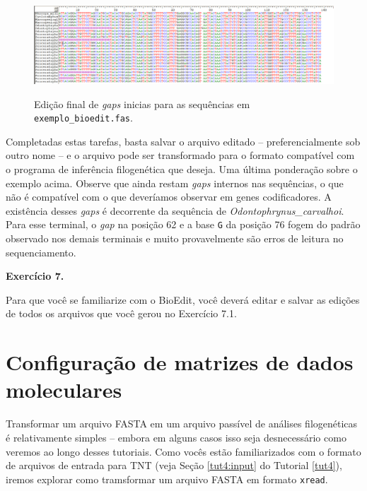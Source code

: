 \begin{refsection}
  \begin{figure}[H]
       \centering
      {\includegraphics[scale=0.3]{figures/tut7/bioedit_edited.eps}}
	{\caption[Bioedit: Edição final de \textit{gaps} inicias]{Edição final de \textit{gaps} inicias para as sequências em \texttt{exemplo\_bioedit.fas}.}\label{tut7:fig:bioedit_edited}}
  \end{figure}


Completadas estas tarefas, basta salvar o arquivo editado -- preferencialmente sob outro nome -- e o arquivo pode ser transformado para o formato compatível com o programa de inferência filogenética que deseja. Uma última ponderação sobre o exemplo acima. Observe que ainda restam \textit{gaps} internos nas sequências, o que não é compatível com o que deveríamos observar em genes codificadores. A existência desses \textit{gaps} é decorrente da sequência de \textit{Odontophrynus\_carvalhoi}. Para esse terminal, o \textit{gap} na posição 62 e a base \texttt{G} da posição 76 fogem do padrão observado nos demais terminais e muito provavelmente são erros de leitura no sequenciamento.\\

\begin{blackBlock}{\textbf{Exercício 7.}}\label{tut7:ex:ex3}

Para que você se familiarize com o BioEdit, você deverá editar e salvar as edições de todos os arquivos que você gerou no Exercício 7.1.

\end{blackBlock}


\section{Configuração de matrizes de dados moleculares}\label{tut7:matrices}

Transformar um arquivo FASTA em um arquivo passível de análises filogenéticas é relativamente simples -- embora em alguns casos isso seja desnecessário como veremos ao longo desses tutoriais. Como vocês estão familiarizados com o formato de arquivos de entrada para TNT (veja Seção \ref{tut4:input} do Tutorial \ref{tut4}), iremos explorar como tramsformar um arquivo FASTA em formato \texttt{xread}.\\


\end{refsection}
